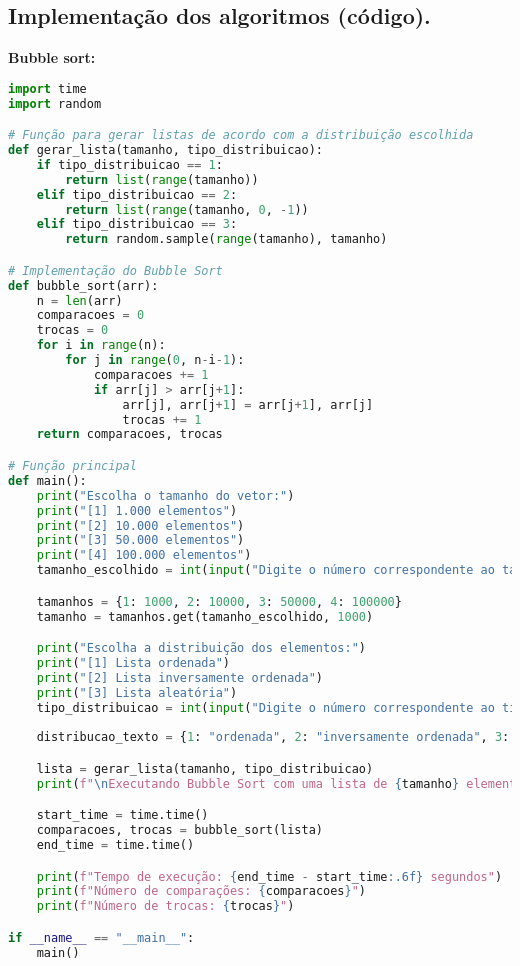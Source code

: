 \documentclass[a4paper,12pt]{article}
\begin{document}
\subsection{Implementação dos algoritmos (código).}
 \textbf{Bubble sort: } \\
\begin{lstlisting}[language=Python]
import time
import random

# Função para gerar listas de acordo com a distribuição escolhida
def gerar_lista(tamanho, tipo_distribuicao):
    if tipo_distribuicao == 1:
        return list(range(tamanho))
    elif tipo_distribuicao == 2:
        return list(range(tamanho, 0, -1))
    elif tipo_distribuicao == 3:
        return random.sample(range(tamanho), tamanho)

# Implementação do Bubble Sort 
def bubble_sort(arr):
    n = len(arr)
    comparacoes = 0
    trocas = 0
    for i in range(n):
        for j in range(0, n-i-1):
            comparacoes += 1
            if arr[j] > arr[j+1]:
                arr[j], arr[j+1] = arr[j+1], arr[j]
                trocas += 1
    return comparacoes, trocas

# Função principal
def main():
    print("Escolha o tamanho do vetor:")
    print("[1] 1.000 elementos")
    print("[2] 10.000 elementos")
    print("[3] 50.000 elementos")
    print("[4] 100.000 elementos")
    tamanho_escolhido = int(input("Digite o número correspondente ao tamanho do vetor: "))

    tamanhos = {1: 1000, 2: 10000, 3: 50000, 4: 100000}
    tamanho = tamanhos.get(tamanho_escolhido, 1000)

    print("Escolha a distribuição dos elementos:")
    print("[1] Lista ordenada")
    print("[2] Lista inversamente ordenada")
    print("[3] Lista aleatória")
    tipo_distribuicao = int(input("Digite o número correspondente ao tipo de distribuição: "))
    
    distribucao_texto = {1: "ordenada", 2: "inversamente ordenada", 3: "aleatória"}

    lista = gerar_lista(tamanho, tipo_distribuicao)
    print(f"\nExecutando Bubble Sort com uma lista de {tamanho} elementos ({distribucao_texto[tipo_distribuicao]}).\n")

    start_time = time.time()
    comparacoes, trocas = bubble_sort(lista)
    end_time = time.time()

    print(f"Tempo de execução: {end_time - start_time:.6f} segundos")
    print(f"Número de comparações: {comparacoes}")
    print(f"Número de trocas: {trocas}")

if __name__ == "__main__":
    main()
\end{lstlisting}
\end{document}

